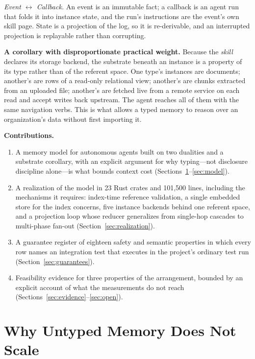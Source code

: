 \documentclass[journal,nofonttune]{IEEEtran}
\begin{document}
\emph{Event $\leftrightarrow$ Callback.} An event is an immutable fact; a
callback is an agent run that folds it into instance state, and the run's
instructions are the event's own skill page. State is a projection of the
log, so it is re-derivable, and an interrupted projection is replayable
rather than corrupting.

\textbf{A corollary with disproportionate practical weight.} Because the \emph{skill} declares its
storage backend, the substrate beneath an instance is a property of its type
rather than of the referent space. One type's instances are documents;
another's are rows of a read-only relational view; another's are chunks
extracted from an uploaded file; another's are fetched live from a remote
service on each read and accept writes back upstream. The agent reaches all
of them with the same navigation verbs. This is what allows a typed memory to
reason over an organization's data without first importing it.

\textbf{Contributions.}
\begin{enumerate}
\item A memory model for autonomous agents built on two dualities and a
  substrate corollary, with an explicit argument for why typing---not
  disclosure discipline alone---is what bounds context cost
  (Sections~\ref{sec:why}--\ref{sec:model}).
\item A realization of the model in 23 Rust crates and 101{,}500 lines,
  including the mechanisms it requires: index-time reference validation, a
  single embedded store for the index concerns, five instance backends behind
  one referent space, and a projection loop whose reducer generalizes from
  single-hop cascades to multi-phase fan-out
  (Section~\ref{sec:realization}).
\item A guarantee register of eighteen safety and semantic properties in
  which every row names an integration test that executes in the project's
  ordinary test run (Section~\ref{sec:guarantees}).
\item Feasibility evidence for three properties of the arrangement, bounded
  by an explicit account of what the measurements do not reach
  (Sections~\ref{sec:evidence}--\ref{sec:open}).
\end{enumerate}

\section{Why Untyped Memory Does Not Scale}
\label{sec:why}
\end{document}
